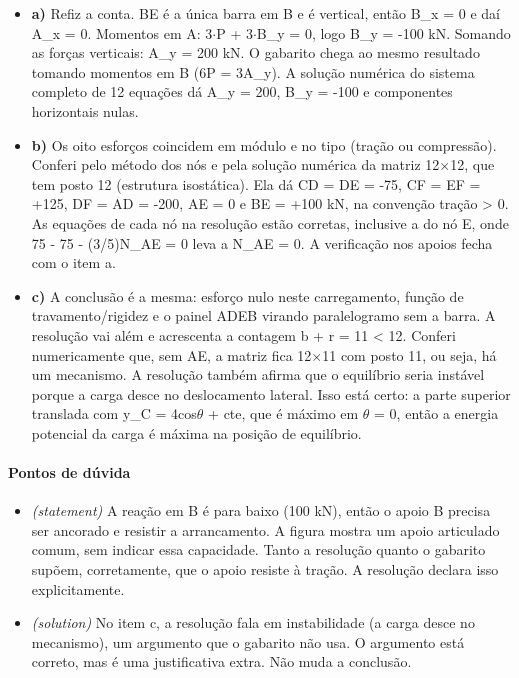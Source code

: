 \documentclass{article}%
\begin{document}
\begin{itemize}%
\item%
\textbf{a)} Refiz a conta. BE é a única barra em B e é vertical, então B\_x = 0 e daí A\_x = 0. Momentos em A: 3$\cdot$P + 3$\cdot$B\_y = 0, logo B\_y = -100 kN. Somando as forças verticais: A\_y = 200 kN. O gabarito chega ao mesmo resultado tomando momentos em B (6P = 3A\_y). A solução numérica do sistema completo de 12 equações dá A\_y = 200, B\_y = -100 e componentes horizontais nulas.%
\item%
\textbf{b)} Os oito esforços coincidem em módulo e no tipo (tração ou compressão). Conferi pelo método dos nós e pela solução numérica da matriz 12$\times$12, que tem posto 12 (estrutura isostática). Ela dá CD = DE = -75, CF = EF = +125, DF = AD = -200, AE = 0 e BE = +100 kN, na convenção tração > 0. As equações de cada nó na resolução estão corretas, inclusive a do nó E, onde 75 - 75 - (3/5)N\_AE = 0 leva a N\_AE = 0. A verificação nos apoios fecha com o item a.%
\item%
\textbf{c)} A conclusão é a mesma: esforço nulo neste carregamento, função de travamento/rigidez e o painel ADEB virando paralelogramo sem a barra. A resolução vai além e acrescenta a contagem b + r = 11 < 12. Conferi numericamente que, sem AE, a matriz fica 12$\times$11 com posto 11, ou seja, há um mecanismo. A resolução também afirma que o equilíbrio seria instável porque a carga desce no deslocamento lateral. Isso está certo: a parte superior translada com y\_C = 4cos$\theta$ + cte, que é máximo em $\theta$ = 0, então a energia potencial da carga é máxima na posição de equilíbrio.%
\end{itemize}%
\paragraph{Pontos de dúvida}%
\begin{itemize}%
\item%
\textit{(statement)} A reação em B é para baixo (100 kN), então o apoio B precisa ser ancorado e resistir a arrancamento. A figura mostra um apoio articulado comum, sem indicar essa capacidade. Tanto a resolução quanto o gabarito supõem, corretamente, que o apoio resiste à tração. A resolução declara isso explicitamente.%
\item%
\textit{(solution)} No item c, a resolução fala em instabilidade (a carga desce no mecanismo), um argumento que o gabarito não usa. O argumento está correto, mas é uma justificativa extra. Não muda a conclusão.%
\end{itemize}%
\end{document}
